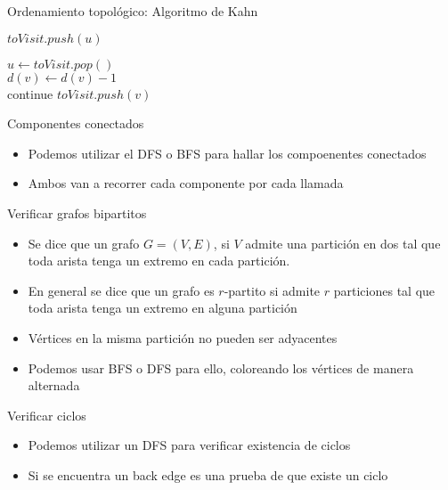 \documentclass[]{beamer}
\begin{document}
\begin{frame}{Ordenamiento topol\'ogico: Algoritmo de Kahn}
  \begin{algorithm}[H]
    {
      {
        {$ toVisit.push(u) $} 
      }
    }

    {
      $ u \gets toVisit.pop() $ \\
      {
        { $d(v) \gets d(v)-1 $} \\
        {
          continue
        }
        $ toVisit.push(v) $
      }
    }
  \end{algorithm}
\end{frame}

\begin{frame}{Componentes conectados}
  \begin{itemize}
    \item Podemos utilizar el DFS o BFS para hallar los compoenentes conectados
      \pause
    \item Ambos van a recorrer cada componente por cada llamada
  \end{itemize}
\end{frame}

\begin{frame}{Verificar grafos bipartitos}
  \begin{itemize}
    \item Se dice que un grafo $G=(V,E)$, si $V$ admite una partici\'on en dos tal que toda arista tenga un extremo en cada partici\'on. 
      \pause
    \item En general se dice que un grafo es $r$-partito si admite $r$ particiones tal que toda arista tenga un extremo en alguna partici\'on
      \pause
    \item V\'ertices en la misma partici\'on no pueden ser adyacentes
      \pause
    \item Podemos usar BFS o DFS para ello, coloreando los v\'ertices de manera alternada
  \end{itemize}
\end{frame}

\begin{frame}{Verificar ciclos}
  \begin{itemize}
    \item Podemos utilizar un DFS para verificar existencia de ciclos
      \pause
    \item Si se encuentra un back edge es una prueba de que existe un ciclo
  \end{itemize}
\end{frame}
\end{document}
